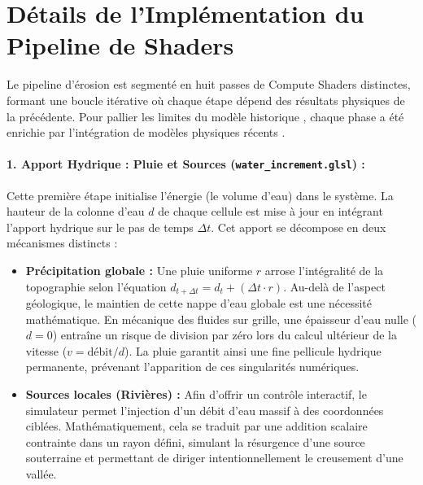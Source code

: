 \documentclass[10pt,twocolumn,a4paper]{article}
\begin{document}
\newpage
\appendix
\section{Détails de l'Implémentation du Pipeline de Shaders}\label{annexe:shaders}

Le pipeline d'érosion est segmenté en huit passes de Compute Shaders distinctes, formant une boucle itérative où chaque étape dépend des résultats physiques de la précédente. Pour pallier les limites du modèle historique \cite{MDH07}, chaque phase a été enrichie par l'intégration de modèles physiques récents \cite{Jako11}.

\paragraph{1. Apport Hydrique : Pluie et Sources (\texttt{water\_increment.glsl}) :}
Cette première étape initialise l'énergie (le volume d'eau) dans le système. La hauteur de la colonne d'eau $d$ de chaque cellule est mise à jour en intégrant l'apport hydrique sur le pas de temps $\Delta t$. Cet apport se décompose en deux mécanismes distincts :
\begin{itemize}
    \item \textbf{Précipitation globale :} Une pluie uniforme $r$ arrose l'intégralité de la topographie selon l'équation $d_{t+\Delta t} = d_t + (\Delta t \cdot r)$. Au-delà de l'aspect géologique, le maintien de cette nappe d'eau globale est une nécessité mathématique. En mécanique des fluides sur grille, une épaisseur d'eau nulle ($d = 0$) entraîne un risque de division par zéro lors du calcul ultérieur de la vitesse ($v = \text{débit} / d$). La pluie garantit ainsi une fine pellicule hydrique permanente, prévenant l'apparition de ces singularités numériques.
    \item \textbf{Sources locales (Rivières) :} Afin d'offrir un contrôle interactif, le simulateur permet l'injection d'un débit d'eau massif à des coordonnées ciblées. Mathématiquement, cela se traduit par une addition scalaire contrainte dans un rayon défini, simulant la résurgence d'une source souterraine et permettant de diriger intentionnellement le creusement d'une vallée.
\end{itemize}
\end{document}
